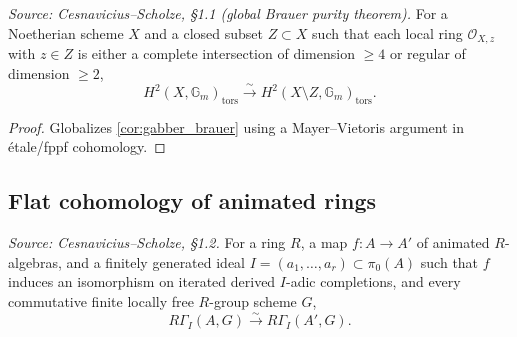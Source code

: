 \begin{corollary}
  \label{cor:brauer_global}
  \textit{Source: Cesnavicius--Scholze, §1.1 (global Brauer purity theorem).}
  For a Noetherian scheme \(X\) and a closed subset \(Z \subset X\) such that each local ring \(\mathcal{O}_{X,z}\) with \(z \in Z\) is either a complete intersection of dimension \(\ge 4\) or regular of dimension \(\ge 2\),
  \[
    H^2(X, \mathbb{G}_m)_{\mathrm{tors}} \xrightarrow{\sim} H^2(X \setminus Z, \mathbb{G}_m)_{\mathrm{tors}}.
  \]
\end{corollary}

\begin{proof}
  \uses{}
  Globalizes \cref{cor:gabber_brauer} using a Mayer--Vietoris argument in étale/fppf cohomology.
\end{proof}

\subsection{Flat cohomology of animated rings}

\begin{theorem}
  \label{thm:excision}
  \textit{Source: Cesnavicius--Scholze, §1.2.}
  For a ring \(R\), a map \(f \colon A \to A'\) of animated \(R\)-algebras, and a finitely generated ideal \(I = (a_1, \ldots, a_r) \subset \pi_0(A)\) such that \(f\) induces an isomorphism on iterated derived \(I\)-adic completions, and every commutative finite locally free \(R\)-group scheme \(G\),
  \[
    R\Gamma_I(A, G) \xrightarrow{\sim} R\Gamma_I(A', G).
  \]
\end{theorem}

